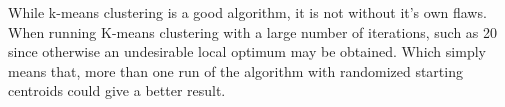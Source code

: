 While k-means clustering is a good algorithm, it is not without it's own flaws. When running K-means clustering with a large number of iterations, such as 20 since otherwise an undesirable local optimum may be obtained. Which simply means that, more than one run of the algorithm with randomized starting centroids could give a better result.


